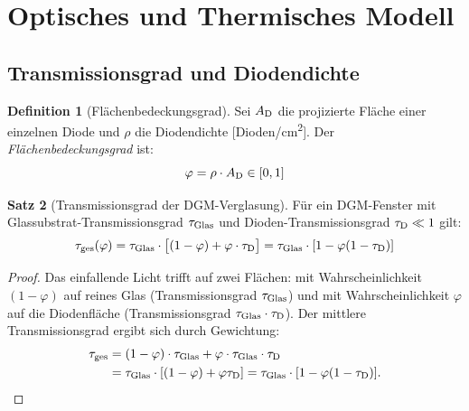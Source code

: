 ﻿\documentclass[a4paper,12pt]{article}
\theoremstyle{definition}
\newtheorem{definition}{Definition}[section]
\newtheorem{satz}[definition]{Satz}
\theoremstyle{remark}
\newcommand{\vph}{\varphi}
\begin{document}
\section{Optisches und Thermisches Modell}
\label{sec:optisch}

\subsection{Transmissionsgrad und Diodendichte}

\begin{definition}[Flächenbedeckungsgrad]
\label{def:phi}
Sei $A_{\rm D}$ die projizierte Fläche einer einzelnen Diode und $\rho$
die Diodendichte [Dioden/cm\textsuperscript{2}]. Der \emph{Flächenbedeckungsgrad}
ist:
\begin{equation}
  \vph = \rho \cdot A_{\rm D} \in [0, 1]
  \label{eq:phi_def}
\end{equation}
\end{definition}

\begin{satz}[Transmissionsgrad der DGM-Verglasung]
\label{satz:transmiss}
Für ein DGM-Fenster mit Glassubs\-trat-Transmissionsgrad $\tau_{\rm Glas}$
und Dioden-Transmissionsgrad $\tau_{\rm D} \ll 1$ gilt:
\begin{equation}
  \tau_{\rm ges}(\vph) = \tau_{\rm Glas} \cdot
    \bigl[(1 - \vph) + \vph \cdot \tau_{\rm D}\bigr]
  = \tau_{\rm Glas} \cdot [1 - \vph(1 - \tau_{\rm D})]
  \label{eq:tau}
\end{equation}
\end{satz}

\begin{proof}
Das einfallende Licht trifft auf zwei Flächen: mit Wahrscheinlichkeit $(1-\vph)$
auf reines Glas (Transmissionsgrad $\tau_{\rm Glas}$) und mit Wahrscheinlichkeit
$\vph$ auf die Diodenfläche (Transmissionsgrad $\tau_{\rm Glas} \cdot \tau_{\rm D}$).
Der mittlere Transmissionsgrad ergibt sich durch Gewichtung:
\begin{align*}
  \tau_{\rm ges} &= (1-\vph) \cdot \tau_{\rm Glas}
                  + \vph \cdot \tau_{\rm Glas} \cdot \tau_{\rm D}\\
                &= \tau_{\rm Glas} \cdot [(1-\vph) + \vph \tau_{\rm D}]
                 = \tau_{\rm Glas} \cdot [1 - \vph(1-\tau_{\rm D})]. \qedhere
\end{align*}
\end{proof}
\end{document}
